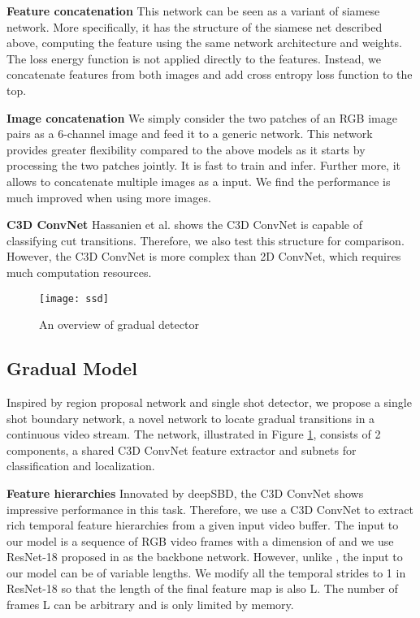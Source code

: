 \documentclass[runningheads]{llncs}
\begin{document}
\textbf{Feature concatenation} This network can be seen as a variant of siamese network. More specifically, it has the structure of the siamese net described above, computing the feature using the same network architecture and weights. The loss energy function is not applied directly to the features. Instead, we concatenate features from both images and add cross entropy loss function to the top.

\textbf{Image concatenation} We simply consider the two patches of an RGB image pairs as a 6-channel image and feed it to a generic network. This network provides greater flexibility compared to the above models as it starts by processing the two patches jointly. It is fast to train and infer. Further more, it allows to concatenate multiple images as a input. We find the performance is much improved when using more images.

\textbf{C3D ConvNet} Hassanien et al.\cite{hassanien2017large} shows the C3D ConvNet is capable of classifying cut transitions. Therefore, we also test this structure for comparison. However, the C3D ConvNet is more complex than 2D ConvNet, which requires much computation resources. 

\begin{figure}
\centering
\texttt{[image: ssd]}
\caption{An overview of gradual detector}\label{fig:3}
\end{figure}

\subsection{Gradual Model}
Inspired by region proposal network\cite{renNIPS15fasterrcnn} and single shot detector\cite{liu2016ssd}, we propose a single shot boundary network, a novel network to locate gradual transitions in a continuous video stream. The network, illustrated in Figure \ref{fig:3}, consists of 2 components, a shared C3D ConvNet feature extractor and subnets for classification and localization.

\textbf{Feature hierarchies} Innovated by deepSBD, the C3D ConvNet shows impressive performance in this task. Therefore, we use a C3D ConvNet to extract rich temporal feature hierarchies from a given input video buffer. The input to our model is a sequence of RGB video frames with a dimension of  and we use ResNet-18 proposed in \cite{hara3dcnns} as the backbone network. However, unlike \cite{hara3dcnns}, the input to our model can be of variable lengths. We modify all the temporal strides to 1 in ResNet-18 so that the length of the final feature map is also L. The number of frames L can be arbitrary and is only limited by memory.
\end{document}
